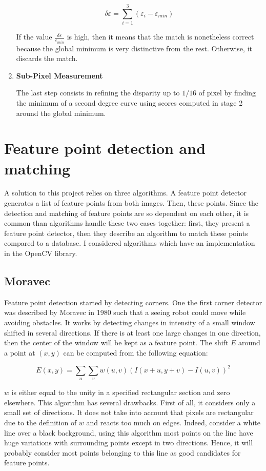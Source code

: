 \documentclass[11pt]{report}
\begin{document}
\begin{enumerate}
\begin{equation}
  \delta \varepsilon = \sum_{i=1}^{3} (\varepsilon_i - \varepsilon_{min}) 
\end{equation}

If the value $\frac{\delta \varepsilon}{\varepsilon_{min}}$ is high, then it means that the match is nonetheless correct because the global minimum is very distinctive from the rest. Otherwise, it discards the match.

  \item \textbf{Sub-Pixel Measurement}

The last step consists in refining the disparity up to $1/16$ of pixel by finding the minimum of a second degree curve using scores computed in stage 2 around the global minimum.
\end{enumerate}

\section{Feature point detection and matching}
A solution to this project relies on three algorithms. A feature point detector generates a list of feature points from both images. Then, these points. Since the detection and matching of feature points are so dependent on each other, it is common than algorithms handle these two cases together: first, they present a feature point detector, then they describe an algorithm to match these points compared to a database. I considered algorithms which have an implementation in the OpenCV library.

\subsection{Moravec}
Feature point detection started by detecting corners. One the first corner detector was described by Moravec in 1980\cite{Moravec80} such that a seeing robot could move while avoiding obstacles. It works by detecting changes in intensity of a small window shifted in several directions. If there is at least one large changes in one direction, then the center of the window will be kept as a feature point. The shift $E$ around a point at $(x,y)$ can be computed from the following equation:

\begin{equation}  
  \label{eq:moravec}
  E(x,y) = \sum_u \sum_v w(u, v) (I(x+u, y+v) - I(u,v))^2
\end{equation}


$w$ is either equal to the unity in a specified rectangular section and zero elsewhere. This algorithm has several drawbacks. First of all, it considers only a small set of directions. It does not take into account that pixels are rectangular due to the definition of $w$ and reacts too much on edges. Indeed, consider a white line over a black background, using this algorithm most points on the line have huge variations with surrounding points except in two directions. Hence, it will probably consider most points belonging to this line as good candidates for feature points.
\end{document}
